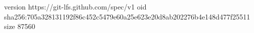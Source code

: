 version https://git-lfs.github.com/spec/v1
oid sha256:705a328131192f86c452c5479e60a25e623e20d8ab202276b4e148d477f25511
size 87560
